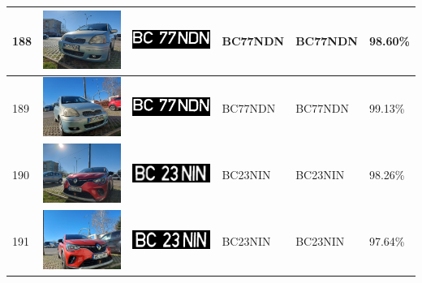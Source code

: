 \documentclass[a4paper,12pt]{report}
\begin{document}
\begin{longtable}{| m{0.6cm} | m{3cm} | m{3cm} | m{1.8cm} | m{1.8cm} | m{1.8cm} |}
    188 & \includegraphics[width=3cm,keepaspectratio]{dataset/117_d1.jpg} & \includegraphics[width=3cm,keepaspectratio]{segmentari/188.jpg} & BC77NDN             & BC77NDN              & 98.60\%    \\ \hline
    189 & \includegraphics[width=3cm,keepaspectratio]{dataset/117_s1.jpg} & \includegraphics[width=3cm,keepaspectratio]{segmentari/189.jpg} & BC77NDN             & BC77NDN              & 99.13\%    \\ \hline
    190 & \includegraphics[width=3cm,keepaspectratio]{dataset/118_d1.jpg} & \includegraphics[width=3cm,keepaspectratio]{segmentari/190.jpg} & BC23NIN             & BC23NIN              & 98.26\%    \\ \hline
    191 & \includegraphics[width=3cm,keepaspectratio]{dataset/118_s1.jpg} & \includegraphics[width=3cm,keepaspectratio]{segmentari/191.jpg} & BC23NIN             & BC23NIN              & 97.64\%    \\ \hline

\end{longtable}
\end{document}
